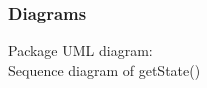 \documentclass{article}
\begin{document}
\subsubsection{Diagrams}
\begin{center}
    Package UML diagram: \\
    Sequence diagram of getState()\\
\end{center}
\end{document}
